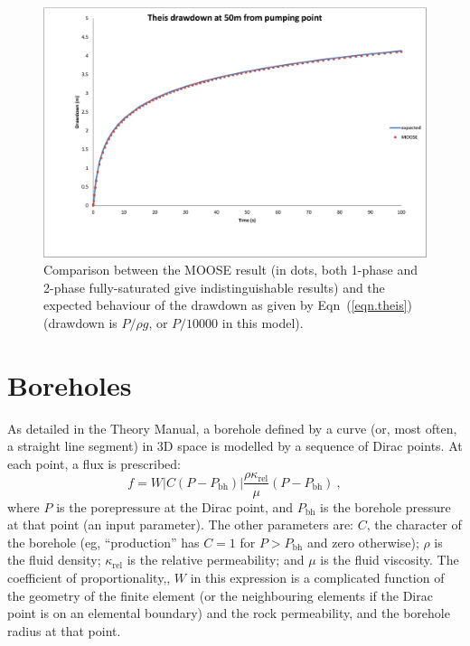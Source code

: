 \documentclass[]{scrreprt}
\begin{document}
\begin{figure}[htb]
\centering
\includegraphics[width=14cm]{th01.eps}
\caption{Comparison between the MOOSE result (in dots, both 1-phase
  and 2-phase fully-saturated give indistinguishable results) and the
  expected behaviour of the drawdown as given by Eqn~(\ref{eqn.theis})
  (drawdown is $P/\rho g$, or $P/10000$ in this model).}
\label{th01.fig}
\end{figure}


\chapter{Boreholes}
\label{bh}

As detailed in the Theory Manual, a borehole defined by a curve (or,
most often, a straight line segment) in 3D space is modelled by a
sequence of Dirac points.  At each point, a flux is prescribed:
\begin{equation}
f = W|C(P-P_{\mathrm{bh}})| \frac{\rho \kappa_{\mathrm{rel}}}{\mu} (P - P_{\mathrm{bh}}) \ ,
\label{bh.propto.eqn}
\end{equation}
where $P$ is the porepressure at the Dirac point, and
$P_{\mathrm{bh}}$ is the borehole pressure at that point (an input
parameter).  The other parameters are: $C$, the character of the
borehole (eg, ``production'' has $C=1$ for $P>P_{\mathrm{bh}}$ and zero
otherwise); $\rho$ is the fluid density; $\kappa_{\mathrm{rel}}$ is
the relative permeability; and $\mu$ is the fluid viscosity.   The
coefficient of proportionality,, $W$ in this expression is a
complicated function of the geometry of the finite element (or the
neighbouring elements if the Dirac point is on an elemental boundary)
and the rock permeability, and the borehole radius at that point.
\end{document}
